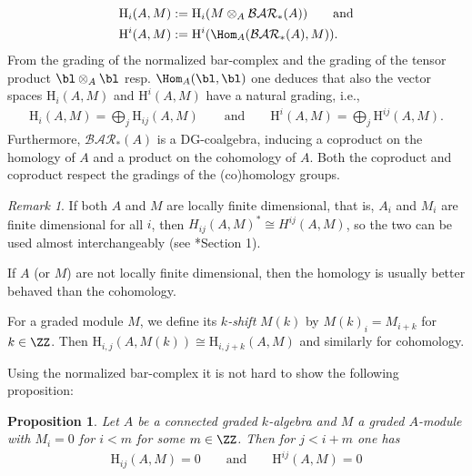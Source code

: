 \documentclass{amsart}
\newtheorem{prop}[thm]{Proposition}
\theoremstyle{definition}
\theoremstyle{remark}
\newtheorem{rem}[thm]{Remark}
\newcommand{\rmH}{\mathrm{H}}
\numberwithin{equation}{section}
\begin{document}
\begin{align*}
    \rmH_i(A,M)&:=\rmH_i(M\otimes_A\mathcal{BAR}_*(A))\qquad \text{and}\\
    \rmH^i(A,M)&:=\rmH^i(\Hom_{A}(\mathcal{BAR}_*(A),M)).
\end{align*}
From the grading of the normalized bar-complex and the grading of the tensor product $\bl \otimes_A\bl$ resp. $\Hom_A(\bl,\bl)$ one deduces that also the vector spaces $\rmH_i(A,M)$ and $\rmH^i(A,M)$ have a natural grading, i.e.,
\begin{align*}
    \rmH_i(A,M)=\bigoplus_{j}\rmH_{ij}(A,M)\qquad\text{and}\qquad \rmH^i(A,M)=\bigoplus_{j}\rmH^{ij}(A,M).
\end{align*}
Furthermore, $\mathcal{BAR}_*(A)$ is a DG-coalgebra, inducing a coproduct on the homology of $A$ and a product on the cohomology of $A$. Both the coproduct and coproduct respect the gradings of the (co)homology groups.
\begin{rem}
    If both $A$ and $M$ are locally finite dimensional, that is, $A_i$ and $M_i$ are finite dimensional for all $i$, then $H_{ij}(A,M)^*\cong H^{ij}(A,M)$, so the two can be used almost interchangeably (see \cite{PositselskiPolishchuk2005}*{Section 1}). 

    If $A$ (or $M$) are not locally finite dimensional, then the homology is usually better behaved than the cohomology. 
\end{rem}
For a graded module $M$, we define its \emph{$k$-shift} $M(k)$ by $M(k)_i=M_{i+k}$ for $k\in \ZZ$. Then $\rmH_{i,j}(A,M(k))\cong \rmH_{i,j+k}(A,M)$ and similarly for cohomology.

Using the normalized bar-complex it is not hard to show the following proposition:
\begin{prop}
\label{prop:CohomologyConcentrated}
    Let $A$ be a connected graded $k$-algebra and $M$ a graded $A$-module with $M_i=0$ for $i<m$ for some $m\in \ZZ$. Then for $j<i+m$ one has
    \begin{align*}
        \rmH_{ij}(A,M)=0\qquad\text{and}\qquad \rmH^{ij}(A,M)=0
    \end{align*}
\end{prop}
\end{document}
